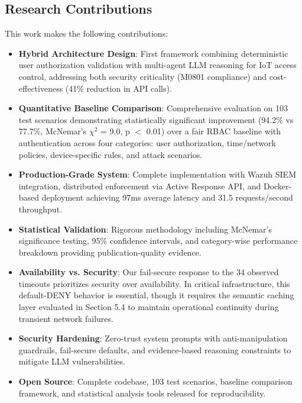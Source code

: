 \documentclass[conference]{IEEEtran}
\begin{document}
\subsection{Research Contributions}

This work makes the following contributions:

\begin{itemize}
    \item \textbf{Hybrid Architecture Design}: First framework combining deterministic user authorization validation with multi-agent LLM reasoning for IoT access control, addressing both security criticality (M0801 compliance) and cost-effectiveness (41\% reduction in API calls).

    \item \textbf{Quantitative Baseline Comparison}: Comprehensive evaluation on 103 test scenarios demonstrating statistically significant improvement (94.2\% vs 77.7\%, McNemar's $\chi^2$ = 9.0, p $<$ 0.01) over a fair RBAC baseline with authentication across four categories: user authorization, time/network policies, device-specific rules, and attack scenarios.

    \item \textbf{Production-Grade System}: Complete implementation with Wazuh SIEM integration, distributed enforcement via Active Response API, and Docker-based deployment achieving 97ms average latency and 31.5 requests/second throughput.

    \item \textbf{Statistical Validation}: Rigorous methodology including McNemar's significance testing, 95\% confidence intervals, and category-wise performance breakdown providing publication-quality evidence.

    \item \textbf{Availability vs. Security}: Our fail-secure response to the 34 observed timeouts prioritizes security over availability. In critical infrastructure, this default-DENY behavior is essential, though it requires the semantic caching layer evaluated in Section 5.4 to maintain operational continuity during transient network failures.

    \item \textbf{Security Hardening}: Zero-trust system prompts with anti-manipulation guardrails, fail-secure defaults, and evidence-based reasoning constraints to mitigate LLM vulnerabilities.

    \item \textbf{Open Source}: Complete codebase, 103 test scenarios, baseline comparison framework, and statistical analysis tools released for reproducibility.
\end{itemize}
\end{document}
